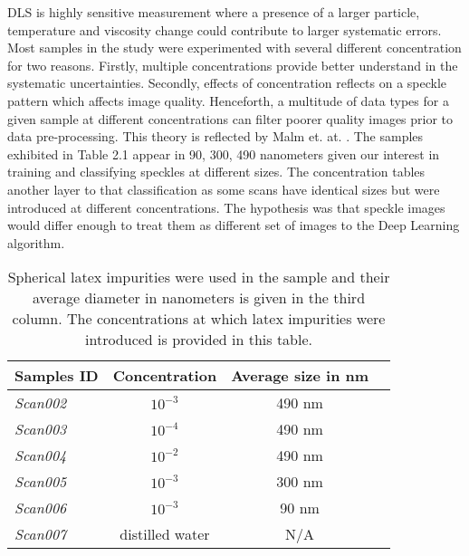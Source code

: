 DLS is highly sensitive measurement where a presence of a larger particle, temperature and viscosity change could contribute to larger systematic errors. Most samples in the study were experimented with several different concentration for two reasons. Firstly, multiple concentrations provide better understand in the systematic uncertainties. Secondly, effects of concentration reflects on a speckle pattern which affects image quality. Henceforth, a multitude of data types for a given sample at different concentrations can filter poorer quality images prior to data pre-processing. This theory is reflected by Malm et. at. \citep{Malm}. The samples exhibited in Table 2.1 appear in 90, 300, 490 nanometers given our interest in training and classifying speckles at different sizes. The concentration tables another layer to that classification as some scans have identical sizes but were introduced at different concentrations. The hypothesis was that speckle images would differ enough to treat them as different set of images to the Deep Learning algorithm. \\



\begin{table}
\begin{center}
\begin{tabular}{|l|c|c|c|}
\hline
{\sc \textbf{Samples ID}}  &  {\sc \textbf{Concentration}}  & {\sc \textbf{Average size in nm}} \\
\hline
{\it Scan002 }  & $ 10^{-3}$ & 490 nm\\
\hline
{\it Scan003 } & $ 10^{-4}$ & 490 nm \\
\hline
{\it Scan004 } & $10^{-2}$  & 490 nm  \\
\hline
{\it Scan005 } &$10^{-3}$  & 300 nm  \\
\hline
{\it Scan006 } &$10^{-3}$  & 90 nm  \\
\hline
{\it Scan007}& distilled water & N/A \\
\hline

\end{tabular}
\end{center}
\caption[Sample size and concentration table]{Spherical latex impurities were used in the sample and their average diameter in nanometers is given in the third column. The concentrations at which latex impurities were introduced is provided in this table.}
\label{table_genomes}
\end{table}

